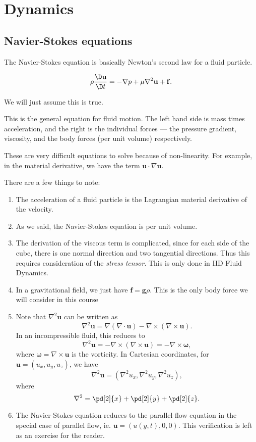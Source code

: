 \documentclass[a4paper]{article}
\begin{document}
\section{Dynamics}
\subsection{Navier-Stokes equations}
The Navier-Stokes equation is basically Newton's second law for a fluid particle.
\begin{law}
  \[
    \rho \frac{\D \mathbf{u}}{\D t} = - \nabla p + \mu \nabla^2 \mathbf{u} + \mathbf{f}.
  \]
\end{law}
We will just assume this is true.

This is the general equation for fluid motion. The left hand side is mass times acceleration, and the right is the individual forces --- the pressure gradient, viscosity, and the body forces (per unit volume) respectively.

These are very difficult equations to solve because of non-linearity. For example, in the material derivative, we have the term $\mathbf{u} \cdot \nabla \mathbf{u}$.

There are a few things to note:
\begin{enumerate}
  \item The acceleration of a fluid particle is the Lagrangian material derivative of the velocity.
  \item As we said, the Navier-Stokes equation is per unit volume.
  \item The derivation of the viscous term is complicated, since for each side of the cube, there is one normal direction and two tangential directions. Thus this requires consideration of the \emph{stress tensor}. This is only done in IID Fluid Dynamics.
  \item In a gravitational field, we just have $\mathbf{f} = \mathbf{g}\rho$. This is the only body force we will consider in this course
  \item Note that $\nabla^2 \mathbf{u}$ can be written as
    \[
      \nabla^2 \mathbf{u} = \nabla (\nabla \cdot \mathbf{u}) - \nabla \times (\nabla \times \mathbf{u}).
    \]
    In an incompressible fluid, this reduces to
    \[
      \nabla^2 \mathbf{u} = -\nabla \times (\nabla \times \mathbf{u}) = -\nabla \times \boldsymbol\omega,
    \]
    where $\boldsymbol\omega = \nabla \times \mathbf{u}$ is the vorticity. In Cartesian coordinates, for $\mathbf{u} = (u_x, u_y, u_z)$, we have
    \[
      \nabla^2 \mathbf{u} = (\nabla^2 u_x, \nabla^2 u_y, \nabla^2 u_z),
    \]
    where
    \[
      \nabla^2 = \pd[2]{x} + \pd[2]{y} + \pd[2]{z}.
    \]
  \item The Navier-Stokes equation reduces to the parallel flow equation in the special case of parallel flow, ie. $\mathbf{u} = (u(y, t), 0, 0)$. This verification is left as an exercise for the reader.
\end{enumerate}
\end{document}
